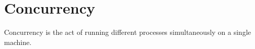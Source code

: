 \documentclass[12pt,a4paper,teal]{bbe}
\begin{document}
	\chapter{Concurrency}
	Concurrency is the act of running different 
	processes simultaneously on a single machine. 
\end{document}
